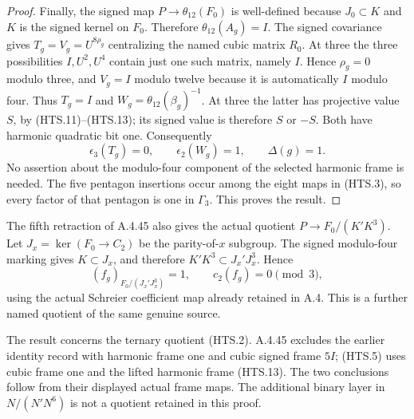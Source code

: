 \begin{proof}
Finally, the signed map $P\to\theta_{12}(F_0)$ is
well-defined because $J_0\subset K$ and $K$ is the
signed kernel on $F_0$.  Therefore
$\theta_{12}(A_g)=I$.  The signed covariance gives
$T_g=V_g=U^{8\rho_g}$ centralizing the named cubic
matrix $R_0$.  At three the three possibilities
$I,U^2,U^4$ contain just one such matrix, namely
$I$.  Hence $\rho_g=0$ modulo three, and $V_g=I$
modulo twelve because it is automatically $I$
modulo four.  Thus $T_g=I$ and
$W_g=\theta_{12}(\beta_g)^{-1}$.
At three the latter has projective value $S$,
by (HTS.11)--(HTS.13); its signed value is therefore
$S$ or $-S$.  Both have harmonic quadratic bit one.
Consequently
\[
       \epsilon_3(T_g)=0,\qquad
       \epsilon_2(W_g)=1,\qquad \Delta(g)=1.
 \tag{HTS.17}
\]
No assertion about the modulo-four component of the
selected harmonic frame is needed.  The five
pentagon insertions occur among the eight maps in
(HTS.3), so every factor of that pentagon is one in
$\Gamma_3$.  This proves the result.
\end{proof}

The fifth retraction of A.4.45 also gives the actual
quotient $P\to F_0/(K'K^3)$.  Let
$J_x=\ker(F_0\to C_2)$ be the parity-of-$x$ subgroup.
The signed modulo-four marking gives $K\subset J_x$,
and therefore $K'K^3\subset J_x'J_x^3$.  Hence
\[
       (f_g)_{F_0/(J_x'J_x^3)}=1,
                  \qquad c_2(f_g)=0\pmod3,
 \tag{HTS.18}
\]
using the actual Schreier coefficient map already
retained in A.4.  This is a further named quotient
of the same genuine source.

The result concerns the ternary quotient (HTS.2).
A.4.45 excludes the earlier identity record with
harmonic frame one and cubic signed frame $5I$;
(HTS.5) uses cubic frame one and the lifted harmonic
frame (HTS.13).  The two conclusions follow from
their displayed actual frame maps.  The additional
binary layer in $N/(N'N^6)$ is not a quotient
retained in this proof.
